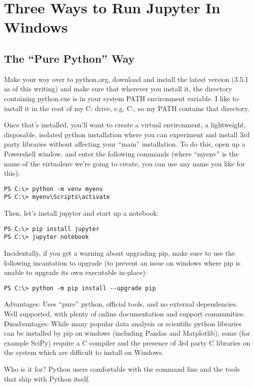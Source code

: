 

\section{Three Ways to Run Jupyter In Windows}

\subsection{The ``Pure Python'' Way}
Make your way over to python.org, download and install the latest version (3.5.1 as of this writing) and make sure that wherever you install it, the directory containing python.exe is in your system PATH environment variable. I like to install it in the root of my C: drive, e.g. C:, so my PATH contains that directory.

Once that's installed, you'll want to create a virtual environment, a lightweight, disposable, isolated python installation where you can experiment and install 3rd party libraries without affecting your ``main'' installation. To do this, open up a Powershell window, and enter the following commands (where ``myenv'' is the name of the virtualenv we're going to create, you can use any name you like for this):
\begin{verbatim}
PS C:\> python -m venv myenv
PS C:\> myenv\Scripts\activate
\end{verbatim}

Then, let's install jupyter and start up a notebook:
\begin{verbatim}
PS C:\> pip install jupyter
PS C:\> jupyter notebook
\end{verbatim}
Incidentally, if you get a warning about upgrading pip, make sure to use the following incantation to upgrade (to prevent an issue on windows where pip is unable to upgrade its own executable in-place):
\begin{verbatim}
PS C:\> python -m pip install --upgrade pip
\end{verbatim}
Advantages: Uses ``pure'' python, official tools, and no external dependencies. Well supported, with plenty of online documentation and support communities.
Disadvantages: While many popular data analysis or scientific python libraries can be installed by pip on windows (including Pandas and Matplotlib), some (for example SciPy) require a C compiler and the presence of 3rd party C libraries on the system which are difficult to install on Windows.

Who is it for? Python users comfortable with the command line and the tools that ship with Python itself.

